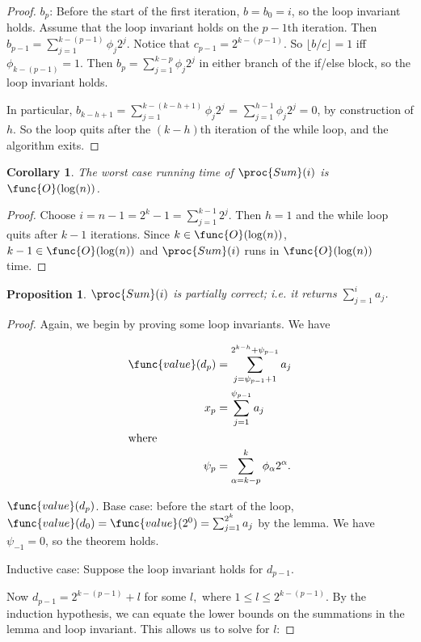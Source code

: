 \documentclass[11pt, answers]{exam}
\theoremstyle{plain}
\newtheorem{corollary}{Corollary}
\newtheorem{proposition}{Proposition}
\theoremstyle{definition}
\begin{document}
\begin{questions}
\begin{parts}
\begin{solution}
\begin{proof}
$b_p$: Before the start of the first iteration, $b = b_0 = i$, so the loop invariant holds. 
Assume that the loop invariant holds on the $p-1$th iteration. Then $b_{p-1} = \sum_{j = 1}^{k-(p-1)}\phi_j 2^j$. Notice that $c_{p-1} =  2^{k-(p-1)}$. So $\lfloor b/c \rfloor = 1$ iff $\phi_{k-(p-1)} = 1$. Then $b_p =\sum_{j = 1}^{k-p}\phi_j 2^j$ in either branch of the if/else block, so the loop invariant holds.

In particular, $b_{k-h +1} = \sum_{j = 1}^{k-(k-h+1)}\phi_j 2^j$ = $\sum_{j = 1}^{h-1}\phi_j 2^j = 0$, by construction of $h$. So the loop quits after the $(k-h)$th iteration of the while loop, and the algorithm exits.
 
\end{proof}

\begin{corollary} \label{runtime1}
The worst case running time of $\proc{Sum}(i)$ is $\func{O}(\log(n))$.
\end{corollary}

\begin{proof}
Choose $i = n - 1 = 2^k -1 = \sum_{j=1}^{k-1}2^j$. Then $h = 1$ and the while loop quits after $k-1$ iterations. Since $k \in \func{O}(\log(n))$, $k-1 \in \func{O}(\log(n))$ and $\proc{Sum}(i)$ runs in $\func{O}(\log(n))$ time.
\end{proof}

\begin{proposition}
$\proc{Sum}(i)$ is partially correct; i.e. it returns $\sum_{j=1}^{i}a_j$.
\end{proposition}

\begin{proof}
Again, we begin by proving some loop invariants. We have

\begin{align*}
\func{value}(d_p) &= \sum_{j=\psi_{p-1} + 1}^{2^{k-h} + \psi_{p-1}}a_j \\
x_p &= \sum_{j=1}^{\psi_{p-1}}a_j \\
\intertext{where} \psi_p &= \sum_{\alpha = k-p}^{k}\phi_{\alpha}2^{\alpha}.
\end{align*}

$\func{value}(d_p)$. Base case: before the start of the loop, $\func{value}(d_0) = \func{value}(2^0)= \sum_{j = 1}^{2^{k}}a_j$ by the lemma. We have $\psi_{-1} = 0$, so the theorem holds. 

Inductive case: Suppose the loop invariant holds for $d_{p-1}$. 

Now $d_{p-1} = 2^{k-(p-1)}+ \mathit{l}$ for some $\mathit{l} ,$ where $ 1 \leq \mathit{l} \leq 2^{k-(p-1)}$. By the induction hypothesis, we can equate the lower bounds on the summations in the lemma and loop invariant. This allows us to solve for $\mathit{l}$:


\end{proof}
\end{solution}
\end{parts}
\end{questions}
\end{document}
